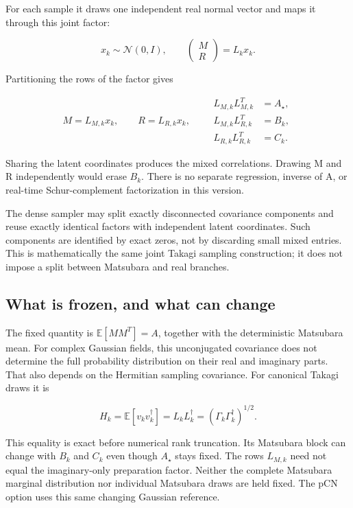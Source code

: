 \documentclass[11pt,a4paper]{article}
\begin{document}
For each sample it draws one independent real normal vector and maps it through this joint factor:

\[
x_k\sim\mathcal N(0,I),\qquad
\begin{pmatrix}M\\R\end{pmatrix}=L_k x_k.
\]

Partitioning the rows of the factor gives

\[
M=L_{M,k}x_k,\qquad R=L_{R,k}x_k,
\qquad
\begin{aligned}
L_{M,k}L_{M,k}^T&=A_\star,\\
L_{M,k}L_{R,k}^T&=B_k,\\
L_{R,k}L_{R,k}^T&=C_k.
\end{aligned}
\]

Sharing the latent coordinates produces the mixed correlations. Drawing M and R independently would erase \(B_k\). There is no separate regression, inverse of A, or real-time Schur-complement factorization in this version.

The dense sampler may split exactly disconnected covariance components and reuse exactly identical factors with independent latent coordinates. Such components are identified by exact zeros, not by discarding small mixed entries. This is mathematically the same joint Takagi sampling construction; it does not impose a split between Matsubara and real branches.

\subsection{What is frozen, and what can change}

The fixed quantity is \(\mathbb E[MM^T]=A\), together with the deterministic Matsubara mean. For complex Gaussian fields, this unconjugated covariance does not determine the full probability distribution on their real and imaginary parts. That also depends on the Hermitian sampling covariance. For canonical Takagi draws it is

\[
H_k=\mathbb E[v_k v_k^\dagger]=L_kL_k^\dagger
    =(\Gamma_k\Gamma_k^\dagger)^{1/2}.
\]

This equality is exact before numerical rank truncation. Its Matsubara block can change with \(B_k\) and \(C_k\) even though \(A_\star\) stays fixed. The rows \(L_{M,k}\) need not equal the imaginary-only preparation factor. Neither the complete Matsubara marginal distribution nor individual Matsubara draws are held fixed. The pCN option uses this same changing Gaussian reference.
\end{document}
